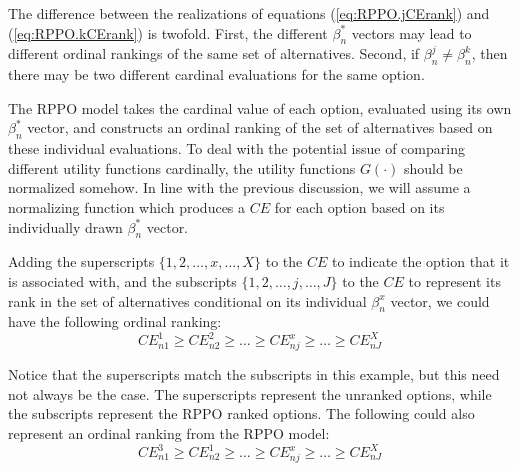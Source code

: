 \documentclass[11pt,a4paper]{article}
\newcommand\CE{\ensuremath{\mathit{CE}}}  %
\begin{document}
The difference between the realizations of equations (\ref{eq:RPPO.jCErank}) and (\ref{eq:RPPO.kCErank}) is twofold.
First, the different $\beta_n^*$ vectors may lead to different ordinal rankings of the same set of alternatives.
Second, if $\beta_n^j \neq \beta_n^k$, then there may be two different cardinal evaluations for the same option.

The RPPO model takes the cardinal value of each option, evaluated using its own $\beta_n^*$  vector, and constructs an ordinal ranking of the set of alternatives based on these individual evaluations.
To deal with the potential issue of comparing different utility functions cardinally, the utility functions $G(\cdot)$ should be normalized somehow.{\footnotemark}
In line with the previous discussion, we will assume a normalizing function which produces a {\CE} for each option based on its individually drawn $\beta_n^*$ vector.

\addtocounter{footnote}{-1}

Adding the superscripts $\{1,2,\ldots,x,\ldots,X\}$  to the {\CE} to indicate the option that it is associated with, and the subscripts $\{1,2,\ldots,j,\ldots,J\}$ to the {\CE} to represent its rank in the set of alternatives conditional on its individual $\beta_n^x$ vector, we could have the following ordinal ranking:
\begin{equation}
	\label{eq:RPPO.CErank.f}
	{\CE}^1_{n1} \geq {\CE}^2_{n2} \geq \ldots \geq {\CE}^x_{nj} \geq \ldots \geq {\CE}^X_{nJ}
\end{equation}

Notice that the superscripts match the subscripts in this example, but this need not always be the case.
The superscripts represent the unranked options, while the subscripts represent the RPPO ranked options.
The following could also represent an ordinal ranking from the RPPO model:
\begin{equation}
	\label{eq:RPPO.CErank.a}
	{\CE}^3_{n1} \geq {\CE}^1_{n2} \geq \ldots \geq {\CE}^x_{nj} \geq \ldots \geq {\CE}^X_{nJ}
\end{equation}
\end{document}
